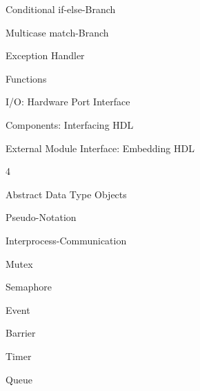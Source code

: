 \def\tocXXXIII{Conditional if-else-Branch}
{\bf{\parbox{0.95\textwidth}{\hskip20pt\tocXXXIII\dotfill\pageref{toclabelXXXIII}}}}\vskip5pt

\def\tocXXXIV{Multicase match-Branch}
{\bf{\parbox{0.95\textwidth}{\hskip20pt\tocXXXIV\dotfill\pageref{toclabelXXXIV}}}}\vskip5pt

\def\tocXXXV{Exception Handler}
{\bf{\parbox{0.95\textwidth}{\hskip20pt\tocXXXV\dotfill\pageref{toclabelXXXV}}}}\vskip5pt

\def\tocXXXVI{Functions}
{\bf{\parbox{0.95\textwidth}{\hskip10pt\tocXXXVI\dotfill\pageref{toclabelXXXVI}}}}\vskip5pt

\def\tocXXXVII{I/O: Hardware Port Interface}
{\bf{\parbox{0.95\textwidth}{\hskip10pt\tocXXXVII\dotfill\pageref{toclabelXXXVII}}}}\vskip5pt

\def\tocXXXVIII{Components: Interfacing HDL}
{\bf{\parbox{0.95\textwidth}{\hskip20pt\tocXXXVIII\dotfill\pageref{toclabelXXXVIII}}}}\vskip5pt

\def\tocXXXIX{External Module Interface: Embedding HDL}
{\bf{\parbox{0.95\textwidth}{\hskip20pt\tocXXXIX\dotfill\pageref{toclabelXXXIX}}}}\vskip5pt

\def\tocXL{Abstract Data Type Objects}
{\vskip5pt\bf\large\hskip-30pt\parbox{30pt}{ 4}\parbox{0.95\textwidth}{\tocXL\dotfill\pageref{toclabelXL}}}\vskip10pt

\def\tocXLI{Pseudo-Notation}
{\bf{\parbox{0.95\textwidth}{\hskip10pt\tocXLI\dotfill\pageref{toclabelXLI}}}}\vskip5pt

\def\tocXLII{Interprocess-Communication}
{\bf{\parbox{0.95\textwidth}{\hskip10pt\tocXLII\dotfill\pageref{toclabelXLII}}}}\vskip5pt

\def\tocXLIII{Mutex}
{\bf{\parbox{0.95\textwidth}{\hskip20pt\tocXLIII\dotfill\pageref{toclabelXLIII}}}}\vskip5pt

\def\tocXLIV{Semaphore}
{\bf{\parbox{0.95\textwidth}{\hskip20pt\tocXLIV\dotfill\pageref{toclabelXLIV}}}}\vskip5pt

\def\tocXLV{Event}
{\bf{\parbox{0.95\textwidth}{\hskip20pt\tocXLV\dotfill\pageref{toclabelXLV}}}}\vskip5pt

\def\tocXLVI{Barrier}
{\bf{\parbox{0.95\textwidth}{\hskip20pt\tocXLVI\dotfill\pageref{toclabelXLVI}}}}\vskip5pt

\def\tocXLVII{Timer}
{\bf{\parbox{0.95\textwidth}{\hskip20pt\tocXLVII\dotfill\pageref{toclabelXLVII}}}}\vskip5pt

\def\tocXLVIII{Queue}
{\bf{\parbox{0.95\textwidth}{\hskip20pt\tocXLVIII\dotfill\pageref{toclabelXLVIII}}}}\vskip5pt

